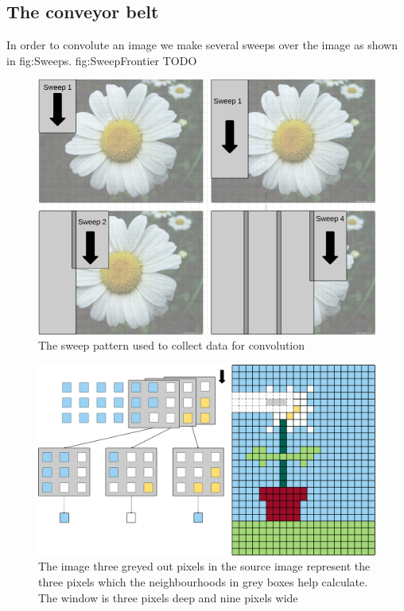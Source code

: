 \subsection{The conveyor belt}
In order to convolute an image we make several sweeps over the image as shown in fig:Sweeps. 
fig:SweepFrontier TODO
\begin{figure}[h!]
    \includegraphics[width=\linewidth]{img/Sweeps.png}
    \caption{The sweep pattern used to collect data for convolution}
    \label{fig:Sweeps}
\end{figure}
\begin{figure}[h!]
    \includegraphics[width=\linewidth]{img/FeedPattern.png}
    \caption{The image three greyed out pixels in the source image represent the three pixels which the neighbourhoods in grey boxes help calculate. The window is three pixels deep and nine pixels wide}
    \label{fig:SweepFrontier}
\end{figure}

